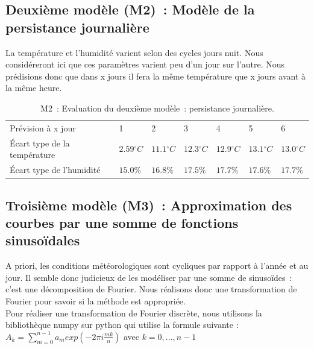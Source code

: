 \documentclass[11pt,a4paper]{article}
\begin{document}
\subsection{Deuxième modèle (M2)~: Modèle de la persistance journalière}
 La température et l'humidité varient selon des cycles jours nuit. Nous considéreront ici que ces paramètres varient peu d'un jour sur l'autre. Nous prédisions donc que dans x jours il fera la même température que x jours avant à la même heure. \\
\begin{table}
\begin{center} 
\begin{tabular}{lllllll}\hline
\hline
Prévision à x jour                  &1                         &2                         &3                           &4                         &5                          &6 \\
Écart type de la température& $2.59{}^{\circ}C$& $11.1{}^{\circ}C$& $12.3{}^{\circ}C$& $12.9{}^{\circ}C$& $13.1{}^{\circ}C$& $13.0{}^{\circ}C$\\
Écart type de l'humidité       &  $ 15.0\% $         &  $ 16.8\% $         &  $ 17.5\% $        &  $ 17.7\% $         &  $ 17.6\% $         &  $ 17.7\% $\\
\hline 
\end{tabular}
\caption{M2~: Evaluation du deuxième modèle~: persistance journalière.}\label{tab:persistanceJ}
\end{center}
\end{table}

\subsection{Troisième modèle (M3)~: Approximation des courbes par une somme de fonctions sinusoïdales}
A priori, les conditions météorologiques sont cycliques par rapport à l'année et au jour. Il semble donc judicieux de les modéliser par une somme de sinusoïdes~: c'est une décomposition de Fourier. Nous réalisons donc une transformation de Fourier pour savoir si la méthode est appropriée. \\
Pour réaliser une transformation de Fourier discrète, nous utilisons la bibliothèque numpy sur python qui utilise la formule suivante :  \\

$ A_{k}  = \displaystyle { \sum_{m=0}^{n-1}} a_{m} exp(-2\pi i \frac{mk}{n} ) $ avec $k = 0, ... , n-1 $   \\ 
\end{document}
